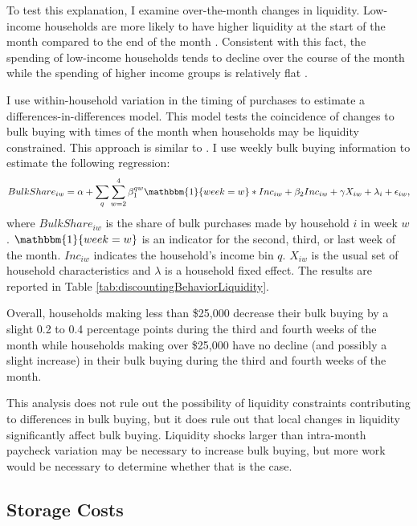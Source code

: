 \documentclass[AER]{AEA_mal}
\begin{document}
To test this explanation, I examine over-the-month changes in liquidity. Low-income households are more likely to have higher liquidity at the start of the month compared to the end of the month \citep{stephens2003, orhun2018}. Consistent with this fact, the spending of low-income households tends to decline over the course of the month while the spending of higher income groups is relatively flat \citep{orhun2018}.

I use within-household variation in the timing of purchases to estimate a
differences-in-differences model. This model tests the coincidence of changes to bulk buying with times of the month when households may be liquidity constrained. This approach is similar to \citet{orhun2018}. I use weekly bulk buying information to estimate the following regression:
\begin{equation}
\label{eq:discountingBehaviorLiquidity}
BulkShare_{iw} = \alpha + \sum_q \sum_{w = 2}^4 \beta_1^{qw} \mathbbm{1}\{week = w\} * Inc_{iw} + \beta_2 Inc_{iw} + \gamma X_{iw} + \lambda_i + \epsilon_{iw},
\end{equation}
where $BulkShare_{iw}$ is the share of bulk purchases made by household $i$ in week $w$. $\mathbbm{1}\{week = w\}$ is an indicator for the second, third, or last week of the month. $Inc_{iw}$ indicates the household's income bin $q$. $X_{iw}$ is the usual set of household characteristics and $\lambda$ is a household fixed effect. The results are reported in Table \ref{tab:discountingBehaviorLiquidity}.



Overall, households making less than \$25,000 decrease their bulk buying by a slight 0.2 to 0.4 percentage points during the third and fourth weeks of the month while households making over \$25,000 have no decline (and possibly a slight increase) in their bulk buying during the third and fourth weeks of the month.

This analysis does not rule out the possibility of liquidity constraints contributing to differences in bulk buying, but it does rule out that local changes in liquidity significantly affect bulk buying. Liquidity shocks larger than intra-month paycheck variation may be necessary to increase bulk buying, but more work would be necessary to determine whether that is the case.

\subsection{Storage Costs}
\label{storageCosts}
\end{document}
